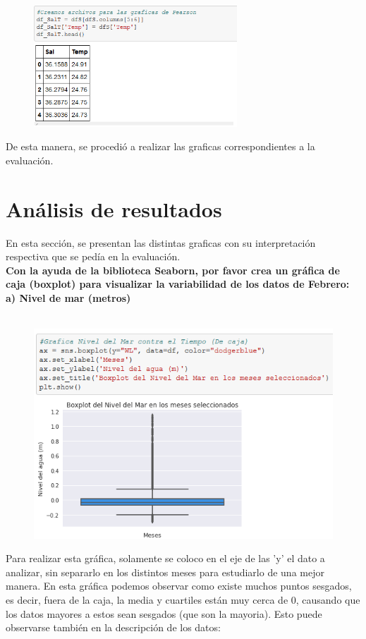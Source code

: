 \documentclass[12pt]{article}
\begin{document}
\begin{figure}[h]
    \centering
\includegraphics[width=3in]{Nuevodf.png}
\end{figure}

De esta manera, se procedió a realizar las graficas correspondientes a la evaluación. 

\section{Análisis de resultados}
En esta sección, se presentan las distintas graficas con su interpretación respectiva que se pedía en la evaluación. \\

\noindent\textbf {Con la ayuda de la biblioteca Seaborn,  por favor crea un gráfica de caja (boxplot) para visualizar la variabilidad de los datos de Febrero: } \\

\noindent\textbf {a) Nivel de mar (metros)} \\ \\

\begin{figure}[h]
    \centering
\includegraphics[width=4.5in]{Caja1.png}
\end{figure}

Para realizar esta gráfica, solamente se coloco en el eje de las 'y' el dato a analizar, sin separarlo en los distintos meses para estudiarlo de una mejor manera. En esta gráfica podemos observar como existe muchos puntos sesgados, es decir, fuera de la caja, la media y cuartiles están muy cerca de 0, causando que los datos mayores a estos sean sesgados (que son la mayoria). Esto puede observarse también en la descripción de los datos:
\end{document}
